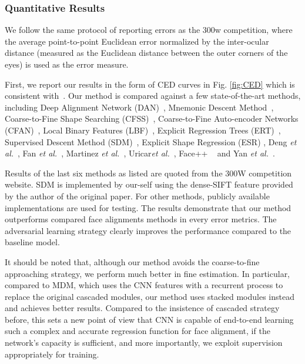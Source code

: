 \documentclass[10pt,journal,compsoc]{IEEEtran}
\begin{document}
\subsubsection{Quantitative Results}\label{subsec:face_result}


We follow the same protocol of reporting errors as the 300w competition, where the average point-to-point Euclidean error normalized by the inter-ocular distance (measured as the Euclidean distance between the outer corners of the eyes) is used as the error measure.

First, we report our results in the form of CED curves in Fig. \ref{fig:CED} which is consistent with~\cite{sagonas2013300}. Our method is compared against a few  state-of-the-art methods, including
Deep Alignment Network (DAN)~\cite{kowalski2017deep}, Mnemonic Descent Method~\cite{trigeorgis2016mnemonic}, Coarse-to-Fine Shape Searching (CFSS)~\cite{zhu2015face}, Coarse-to-Fine Auto-encoder Networks (CFAN)~\cite{zhang2014coarse}, Local Binary Features (LBF)~\cite{ren2014face}, Explicit Regression Trees (ERT)~\cite{kazemi2014one}, Supervised Descent Method (SDM)~\cite{xiong2013supervised}, Explicit Shape Regression (ESR) \cite{cao2014face}, Deng \emph{et al.}~\cite{deng2016m}, Fan \emph{et al.}~\cite{fan2016approaching}, Martinez \emph{et al.}~\cite{martinez20162}, Uricar\emph{et al.}~\cite{martinez20162}, Face++ ~\cite{zhou2013extensive} and Yan \emph{et  al.}~\cite{yan2013learn}.


Results of the last six methods as listed are quoted from the 300W competition website.
SDM is implemented by our-self  using the dense-SIFT feature provided by the author of the original paper.
For other methods, publicly available implementations are used for testing.
The results  demonstrate that our method outperforms compared face alignments methods in every error metrics.
The adversarial learning strategy clearly
improves the performance compared to the baseline model.



It should be noted that,  although our method avoids the coarse-to-fine approaching strategy, we perform much better in fine estimation.
In particular, compared to MDM, which uses the CNN features with a recurrent process to replace the original cascaded modules, our method uses stacked modules instead and achieves better results.
Compared to the insistence of cascaded strategy before, this sets a new point of view that CNN is capable of end-to-end learning such a complex and accurate regression function for face alignment,
if the network's capacity is sufficient, and more importantly,
we exploit  supervision  appropriately for training.
\end{document}
